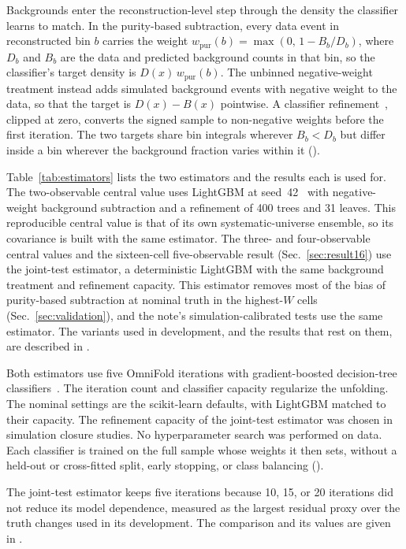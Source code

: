 Backgrounds enter the reconstruction-level step through the density the classifier learns to match.
In the purity-based subtraction, every data event in reconstructed bin $b$ carries the weight
$w_{\mathrm{pur}}(b)=\max(0,\,1-B_{b}/D_{b})$, where $D_{b}$ and $B_{b}$ are the data and predicted background
counts in that bin, so the classifier's target density is $D(x)\,w_{\mathrm{pur}}(b)$.
The unbinned negative-weight treatment instead adds simulated background events with negative weight to the data,
so that the target is $D(x)-B(x)$ pointwise.
A classifier refinement~\cite{StayPositive2025}, clipped at zero, converts the signed sample to non-negative weights
before the first iteration.
The two targets share bin integrals wherever $B_{b}<D_{b}$ but differ inside a bin wherever the background fraction
varies within it ().

Table~\ref{tab:estimators} lists the two estimators and the results each is used for.
The two-observable central value uses LightGBM at seed~42~\cite{Ke:2017lightgbm} with negative-weight background subtraction and a
refinement of 400 trees and 31 leaves.
This reproducible central value is that of its own systematic-universe ensemble, so its covariance is built with
the same estimator.
The three- and four-observable central values and the sixteen-cell five-observable result (Sec.~\ref{sec:result16})
use the joint-test estimator, a deterministic LightGBM with the same background treatment and refinement capacity.
This estimator removes most of the bias of purity-based subtraction at nominal truth in the highest-$W$ cells
(Sec.~\ref{sec:validation}), and the note's simulation-calibrated tests use the same estimator.
The variants used in development, and the results that rest on them, are described in .

Both estimators use five OmniFold iterations with gradient-boosted decision-tree
classifiers~\cite{Pedregosa:2011sklearn,Ke:2017lightgbm}.
The iteration count and classifier capacity regularize the unfolding.
The nominal settings are the scikit-learn defaults, with LightGBM matched to their capacity.
The refinement capacity of the joint-test estimator was chosen in simulation closure studies.
No hyperparameter search was performed on data.
Each classifier is trained on the full sample whose weights it then sets, without a held-out or cross-fitted split,
early stopping, or class balancing ().

The joint-test estimator keeps five iterations because 10, 15, or 20 iterations did not reduce its model
dependence, measured as the largest residual proxy over the truth changes used in its development.
The comparison and its values are given in .

